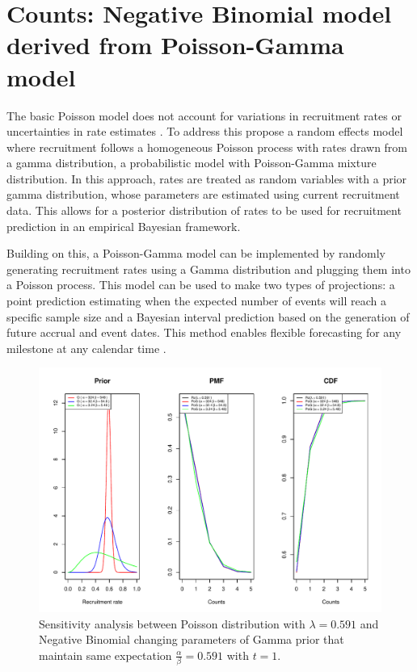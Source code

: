 \section{Counts: Negative Binomial model derived from Poisson-Gamma model}

The basic Poisson model does not account for variations in recruitment rates or uncertainties in rate estimates \citep{mountain2022recruitment}. To address this \cite{anisimov2007modelling} propose a random effects model where recruitment follows a homogeneous Poisson process with rates drawn from a gamma distribution, a probabilistic model with Poisson-Gamma mixture distribution. In this approach, rates are treated as random variables with a prior gamma distribution, whose parameters are estimated using current recruitment data. This allows for a posterior distribution of rates to be used for recruitment prediction in an empirical Bayesian framework.  

Building on this, a Poisson-Gamma model can be implemented by randomly generating recruitment rates using a Gamma distribution and plugging them into a Poisson process. This model can be used to make two types of projections: a point prediction estimating when the expected number of events will reach a specific sample size and a Bayesian interval prediction based on the generation of future accrual and event dates. This method enables flexible forecasting for any milestone at any calendar time \citep{bagiella2001predicting}.


\begin{figure}
\begin{knitrout}
\color{fgcolor}

{\centering \includegraphics[width=\textwidth-3cm]{figure/ch02_figunnamed-chunk-7-1} 

}


\end{knitrout}
	\caption{Sensitivity analysis between Poisson distribution with $\lambda = 0.591$ and Negative Binomial changing parameters of Gamma prior that maintain same expectation $\frac{\alpha}{\beta} = 0.591$ with $t=1$.}
  \label{fig:2_6}
\end{figure}


